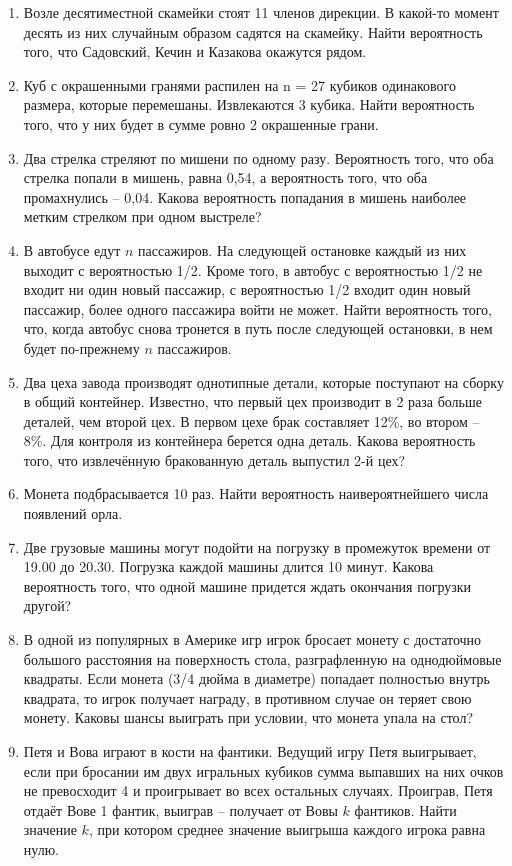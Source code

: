 \documentclass[12pt]{article} %
\begin{document}
\begin{enumerate}
\begin{enumerate}
	\item Возле десятиместной скамейки стоят 11 членов дирекции. В какой-то момент десять из них случайным образом садятся на скамейку. Найти вероятность того, что Садовский, Кечин и Казакова окажутся рядом.

\newpage
	\item Куб с окрашенными гранями распилен на n = 27 кубиков одинакового размера, которые перемешаны. Извлекаются 3 кубика. Найти вероятность того, что у них будет в сумме ровно 2 окрашенные грани.

	\item Два стрелка стреляют по мишени по одному разу. Вероятность того, что оба стрелка попали в мишень, равна 0,54, а вероятность того, что оба промахнулись – 0,04. Какова вероятность попадания в мишень наиболее метким стрелком при одном выстреле?
	\item В автобусе едут $n$ пассажиров. На следующей остановке каждый из них выходит с вероятностью 1/2. Кроме того, в автобус с вероятностью 1/2 не входит ни один новый пассажир, с вероятностью 1/2 входит один новый пассажир, более одного пассажира войти не может. Найти вероятность того, что, когда автобус снова тронется в путь после следующей остановки, в нем будет по-прежнему $n$ пассажиров.
	\item Два цеха завода производят однотипные детали, которые поступают на сборку в общий контейнер. Известно, что первый цех производит в 2 раза больше деталей, чем второй цех. В первом цехе брак составляет 12\%, во втором – 8\%. Для контроля из контейнера берется одна деталь. Какова вероятность того, что извлечённую бракованную деталь выпустил 2-й цех?
	\item Монета подбрасывается 10 раз. Найти вероятность наивероятнейшего числа появлений орла.
	\item Две грузовые машины могут подойти на погрузку в промежуток времени от 19.00 до 20.30. Погрузка каждой машины длится 10 минут. Какова вероятность того, что одной машине придется ждать окончания погрузки другой?
	\item В одной из популярных в Америке игр игрок бросает монету с достаточно большого расстояния на поверхность стола, разграфленную на однодюймовые квадраты. Если монета (3/4 дюйма в диаметре) попадает полностью внутрь квадрата, то игрок получает награду, в противном случае он теряет свою монету. Каковы шансы выиграть при условии, что монета упала на стол?
	\item Петя и Вова играют в кости на фантики. Ведущий игру Петя выигрывает, если при бросании им двух игральных кубиков сумма выпавших на них очков не превосходит 4 и проигрывает во всех остальных случаях. Проиграв, Петя отдаёт Вове 1 фантик, выиграв – получает от Вовы $k$ фантиков. Найти значение $k$, при котором среднее значение выигрыша каждого игрока равна нулю.

\end{enumerate}
\end{enumerate}
\end{document}
